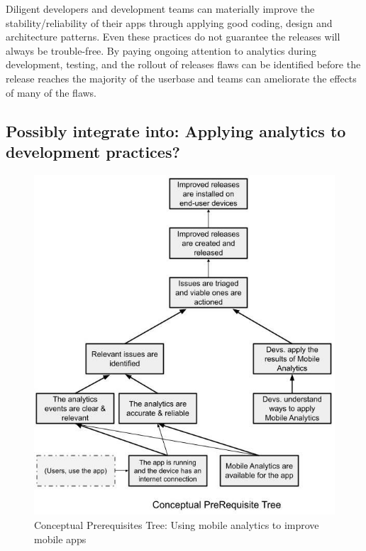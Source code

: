 Diligent developers and development teams can materially improve the stability/reliability of their apps through applying good coding, design and architecture patterns. Even these practices do not guarantee the releases will always be trouble-free. By paying ongoing attention to analytics during development, testing, and the rollout of releases flaws can be identified before the release reaches the majority of the userbase and teams can ameliorate the effects of many of the flaws.

\clearpage 
\subsection{Possibly integrate into: Applying analytics to development practices?}
\begin{figure}
    \centering
    \includegraphics[width=12.5cm]{images/my/Conceptual_prereq_tree_Applying_Theory_of_Constraints_to_using_Mobile_Analytics_to_improve_Mobile_Apps.jpeg}
    \caption{Conceptual Prerequisites Tree: Using mobile analytics to improve mobile apps}
    \label{fig:using-toc-cpt-using-mobile-analytics-to-improve-mobile-apps}
\end{figure}


